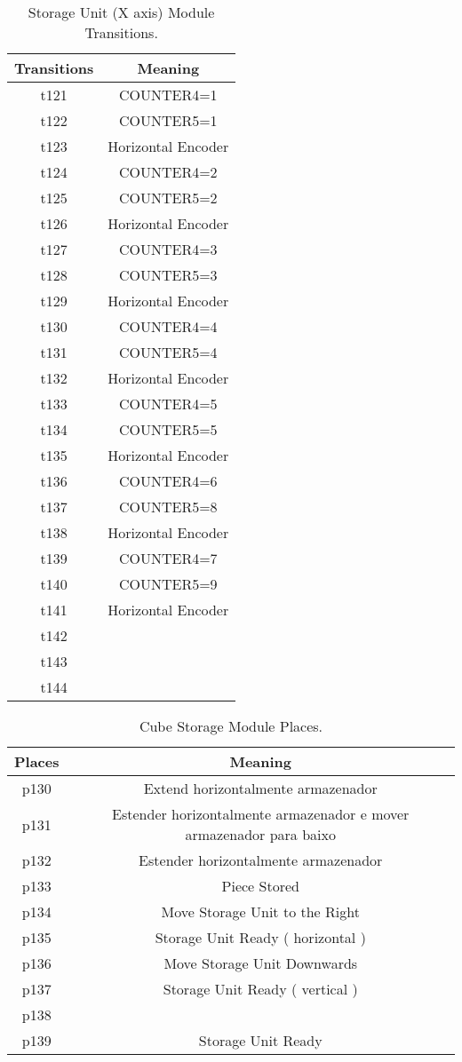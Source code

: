 \begin{table}[htbp]
\caption{Storage Unit (X axis) Module Transitions.}
\centering
\begin{tabular}{cc}
Transitions & Meaning\\
\hline
t121 & COUNTER4=1\\
t122 & COUNTER5=1\\
t123 & Horizontal Encoder\\
t124 & COUNTER4=2\\
t125 & COUNTER5=2\\
t126 & Horizontal Encoder\\
t127 & COUNTER4=3\\
t128 & COUNTER5=3\\
t129 & Horizontal Encoder\\
t130 & COUNTER4=4\\
t131 & COUNTER5=4\\
t132 & Horizontal Encoder\\
t133 & COUNTER4=5\\
t134 & COUNTER5=5\\
t135 & Horizontal Encoder\\
t136 & COUNTER4=6\\
t137 & COUNTER5=8\\
t138 & Horizontal Encoder\\
t139 & COUNTER4=7\\
t140 & COUNTER5=9\\
t141 & Horizontal Encoder\\
t142 & \\
t143 & \\
t144 & \\
\end{tabular}
\end{table}
\begin{table}[htbp]
\caption{Cube Storage Module Places.}
\centering
\begin{tabular}{cc}
Places & Meaning\\
\hline
p130 & Extend horizontalmente armazenador\\
p131 & Estender horizontalmente armazenador e mover armazenador para baixo\\
p132 & Estender horizontalmente armazenador\\
p133 & Piece Stored\\
p134 & Move Storage Unit to the Right\\
p135 & Storage Unit Ready ( horizontal )\\
p136 & Move Storage Unit Downwards\\
p137 & Storage Unit Ready ( vertical )\\
p138 & \\
p139 & Storage Unit Ready\\
\end{tabular}
\end{table}

